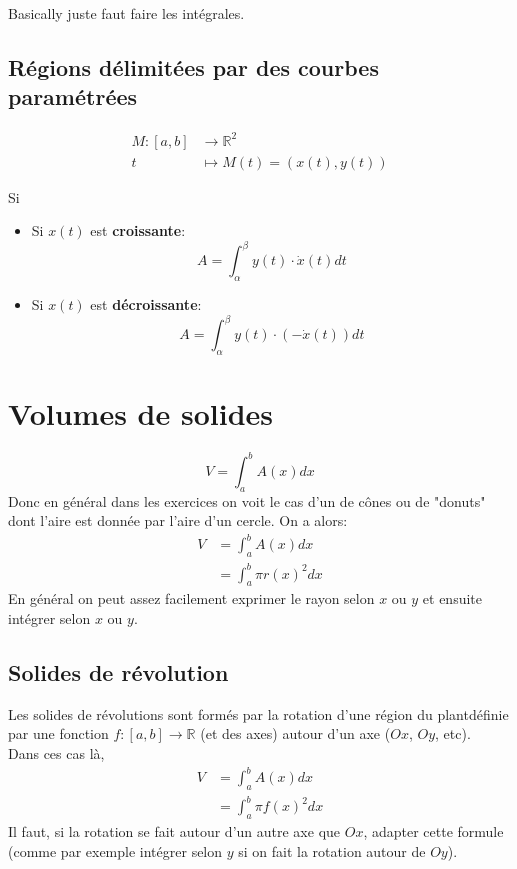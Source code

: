 \documentclass[10pt,a4paper]{book}
\newcommand{\R}{\mathbb{R}}
\begin{document}
Basically juste faut faire les intégrales.

\subsection{Régions délimitées par des courbes paramétrées}

\begin{equation*}
\begin{split}
M:[a,b] & \rightarrow \R^2 \\
t & \mapsto M(t) = (x(t), y(t))
\end{split}
\end{equation*}

Si
\begin{itemize}
\item Si $x(t)$ est \textbf{croissante}:
\[A = \int_\alpha^\beta y(t)\cdot \dot{x}(t)dt\]
\item Si $x(t)$ est \textbf{décroissante}:
\[A = \int_\alpha^\beta y(t)\cdot (-\dot{x}(t))	dt\]
\end{itemize}

\section{Volumes de solides}

\[V = \int_a^b A(x)dx \]
Donc en général dans les exercices on voit le cas d'un de cônes ou de "donuts" dont l'aire est donnée par l'aire d'un cercle. On a alors:
\begin{equation*}
\begin{split}
V&= \int_a^b A(x)dx \\
&= \int_a^b \pi r(x)^2 dx 
\end{split}
\end{equation*}
En général on peut assez facilement exprimer le rayon selon $x$ ou $y$ et ensuite intégrer selon $x$ ou $y$.

\subsection{Solides de révolution}

Les solides de révolutions sont formés par la rotation d'une région du plantdéfinie par une fonction $f:[a,b]\rightarrow \R$ (et des axes) autour d'un axe ($Ox$, $Oy$, etc). \\
Dans ces cas là,
\begin{equation*}
\begin{split}
V&= \int_a^b A(x)dx \\
&= \int_a^b \pi f(x)^2 dx 
\end{split}
\end{equation*}
Il faut, si la rotation se fait autour d'un autre axe que $Ox$, adapter cette formule (comme par exemple intégrer selon $y$ si on fait la rotation autour de $Oy$).
\end{document}
